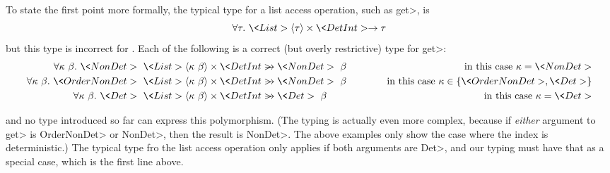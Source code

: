 To state the first point more formally, the 
typical type for a list access operation, such as \<get>, is
$$\forallt{\tau} \<List>\angles{\tau} \times \<Det Int> \rightarrow \tau$$
but this type is incorrect for \ourTypeSystem.  Each of the following is a
correct (but overly restrictive) type for \<get>:
\begin{eqnarray*}
\forallt{\kappa\ \beta} \<NonDet>\ \<List>\angles{\kappa\ \beta} \times \<Det Int>
& \strut\hspace{-1em} \rightarrow \<NonDet>\ \beta
& \mbox{\quad in this case $\kappa = \<NonDet>$} \\
\forallt{\kappa\ \beta} \<OrderNonDet>\ \<List>\angles{\kappa\ \beta} \times \<Det Int>
& \strut\hspace{-1em} \rightarrow \<NonDet>\ \beta
& \mbox{\quad in this case $\kappa \in \{ \<OrderNonDet>, \<Det> \} $} \\
\forallt{\kappa\ \beta} \<Det>\ \<List>\angles{\kappa\ \beta} \times \<Det Int>
& \strut\hspace{-1em} \rightarrow \<Det>\ \beta\phantom{\<Non>}
& \mbox{\quad in this case $\kappa = \<Det>$}
\end{eqnarray*}

\noindent
and no type introduced so far can express this polymorphism.
(The typing is actually even more complex, because if \emph{either}
argument to \<get> is \<OrderNonDet> or \<NonDet>, then the
result is \<NonDet>.  The above examples only show the case where the index
is deterministic.)
The typical type fro the list access operation only applies if both
arguments are \<Det>,
and our typing must have that as a special case, which is the first line above.






